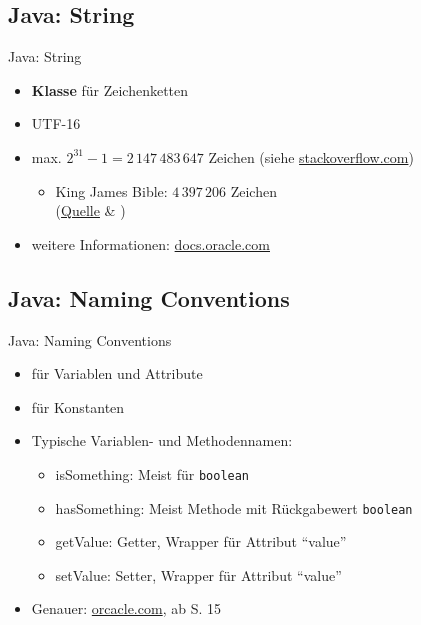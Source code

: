 \documentclass[usepdftitle=false,hyperref={pdfpagelabels=false}]{beamer}
\begin{document}
\subsection{Java: String}
\begin{frame}{Java: String}
    \begin{itemize}
        \item \textbf{Klasse} für Zeichenketten
        \item UTF-16
        \item max. $2^{31}-1 = 2\,147\,483\,647$ Zeichen (siehe \href{http://stackoverflow.com/a/816152/562769}{stackoverflow.com})
          \begin{itemize}
            \item King James Bible: $4\,397\,206$ Zeichen\\
                  (\href{http://printkjv.ifbweb.com/\#downloads}{Quelle} \& )
          \end{itemize}
        \item weitere Informationen: \href{http://docs.oracle.com/javase/7/docs/api/java/lang/String.html}{docs.oracle.com}
    \end{itemize}
\end{frame}

\subsection{Java: Naming Conventions}
\begin{frame}{Java: Naming Conventions}
    \begin{itemize}
        \item {} für Variablen und Attribute
        \item {} für Konstanten
        \item Typische Variablen- und Methodennamen:
          \begin{itemize}
            \item isSomething: Meist für \texttt{boolean}
            \item hasSomething: Meist Methode mit Rückgabewert \texttt{boolean}
            \item getValue: Getter, Wrapper für Attribut "`value"'
            \item setValue: Setter, Wrapper für Attribut "`value"'
          \end{itemize}
        \item Genauer: \href{http://www.oracle.com/technetwork/java/codeconventions-150003.pdf}{orcacle.com}, ab S. 15
    \end{itemize}
\end{frame}
\end{document}
